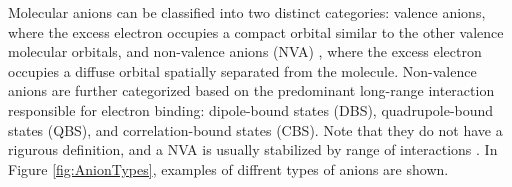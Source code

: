 Molecular anions can be classified into two distinct categories: valence anions, where the excess electron occupies a compact orbital similar to the other valence molecular orbitals, and non-valence anions (NVA) , where the excess electron occupies a diffuse orbital spatially separated from the molecule. Non-valence anions are further categorized based on the predominant long-range interaction responsible for electron binding: dipole-bound states (DBS), quadrupole-bound states (QBS), and correlation-bound states (CBS). Note that they do not have a rigurous definition, and a NVA is usually stabilized by range of interactions \cite{simons2008molecular,herbert2015quantum,abdoul1998electrons,simons2023molecular,jordan2003theory}. In Figure \ref{fig:AnionTypes}, examples of diffrent types of anions are shown.

